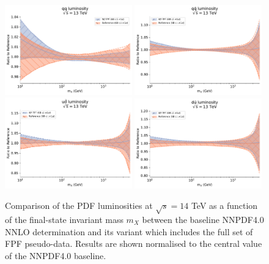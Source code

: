 \begin{figure}[t]
\centering
\includegraphics[width=0.49\textwidth]{plots/qqlumi_nnpdf40_allfpf.pdf}
\includegraphics[width=0.49\textwidth]{plots/qqbarlumi_nnpdf40_allfpf.pdf}
\includegraphics[width=0.49\textwidth]{plots/udbarlumi_nnpdf40_allfpf.pdf}
\includegraphics[width=0.49\textwidth]{plots/dubarlumi_nnpdf40_allfpf.pdf}
\caption{Comparison of the PDF luminosities at $\sqrt{s}=14$ TeV
  as a function of the final-state invariant mass $m_X$ between
  the baseline NNPDF4.0 NNLO determination and its variant which includes
  the full set of FPF pseudo-data.
  Results are shown normalised to the central value of the NNPDF4.0 baseline.
%
}
\label{fig:nnpdf40_fpf_lumis}
\end{figure}

